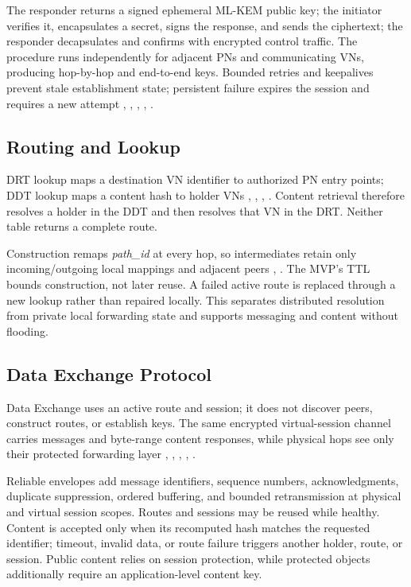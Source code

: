 \documentclass[
  12pt,
  oneside,
  a4paper,
  chapter=TITLE,
  section=TITLE,
  english,
  brazil
]{abntex2}
\begin{document}
The responder returns a signed ephemeral ML-KEM public key; the initiator verifies it, encapsulates a secret, signs the response, and sends the ciphertext; the responder decapsulates and confirms with encrypted control traffic. The procedure runs independently for adjacent PNs and communicating VNs, producing hop-by-hop and end-to-end keys. Bounded retries and keepalives prevent stale establishment state; persistent failure expires the session and requires a new attempt \cite{li2022unreachable}, \cite{augustine2022byzantine}, \cite{mirzaei2018pk}, \cite{bos2017kyber}, \cite{nist2024fips203}.

\subsection{Routing and Lookup}

DRT lookup maps a destination VN identifier to authorized PN entry points; DDT lookup maps a content hash to holder VNs \cite{li2022unreachable}, \cite{augustine2022byzantine}, \cite{mirzaei2018pk}, \cite{qian2016garlic}. Content retrieval therefore resolves a holder in the DDT and then resolves that VN in the DRT. Neither table returns a complete route.

Construction remaps \textit{path\_id} at every hop, so intermediates retain only incoming/outgoing local mappings and adjacent peers \cite{mirzaei2018pk}, \cite{qian2016garlic}. The MVP's TTL bounds construction, not later reuse. A failed active route is replaced through a new lookup rather than repaired locally. This separates distributed resolution from private local forwarding state and supports messaging and content without flooding.

\subsection{Data Exchange Protocol}

Data Exchange uses an active route and session; it does not discover peers, construct routes, or establish keys. The same encrypted virtual-session channel carries messages and byte-range content responses, while physical hops see only their protected forwarding layer \cite{augustine2022byzantine}, \cite{mirzaei2018pk}, \cite{qian2016garlic}, \cite{bos2017kyber}, \cite{nist2024fips203}.

Reliable envelopes add message identifiers, sequence numbers, acknowledgments, duplicate suppression, ordered buffering, and bounded retransmission at physical and virtual session scopes. Routes and sessions may be reused while healthy. Content is accepted only when its recomputed hash matches the requested identifier; timeout, invalid data, or route failure triggers another holder, route, or session. Public content relies on session protection, while protected objects additionally require an application-level content key.
\end{document}
